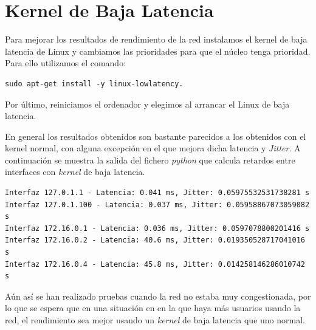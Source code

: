 \section{Kernel de Baja Latencia}

Para mejorar los resultados de rendimiento de la red instalamos el kernel de baja latencia de Linux y cambiamos las prioridades para que el núcleo tenga prioridad. Para ello utilizamos el comando:
\begin{verbatim}
sudo apt-get install -y linux-lowlatency.
\end{verbatim}
Por último, reiniciamos el ordenador y elegimos al arrancar el Linux de baja latencia.

En general los resultados obtenidos son bastante parecidos a los obtenidos con el kernel normal, con alguna excepción en el que mejora dicha latencia y \textit{Jitter}. A continuación se muestra la salida del fichero \textit{python} que calcula retardos entre interfaces con \textit{kernel} de baja latencia.

\begin{lstlisting}
Interfaz 127.0.1.1 - Latencia: 0.041 ms, Jitter: 0.05975532531738281 s
Interfaz 127.0.1.100 - Latencia: 0.037 ms, Jitter: 0.05958867073059082 s
Interfaz 172.16.0.1 - Latencia: 0.036 ms, Jitter: 0.0597078800201416 s
Interfaz 172.16.0.2 - Latencia: 40.6 ms, Jitter: 0.019350528717041016 s
Interfaz 172.16.0.4 - Latencia: 45.8 ms, Jitter: 0.014258146286010742 s
\end{lstlisting}

Aún así se han realizado pruebas cuando la red no estaba muy congestionada, por lo que se espera que en una situación en en la que haya más usuarios usando la red, el rendimiento sea mejor usando un \textit{kernel} de baja latencia que uno normal. 

